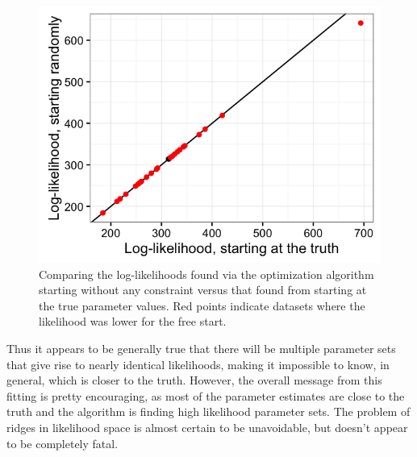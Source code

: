 \documentclass[12pt,reqno,final,pdftex]{amsart}\usepackage[]{graphicx}\usepackage[]{color}
\newenvironment{knitrout}{}{} %
\theoremstyle{plain}
\numberwithin{equation}{part}
\begin{document}
\begin{knitrout}\scriptsize
{}\color{fgcolor}\begin{figure}

\includegraphics[width=\linewidth]{figure/lik-comparison-2-1} \hfill{}

\caption[Comparing the log-likelihoods found via the optimization algorithm starting without any constraint versus that found from starting at the true parameter values]{Comparing the log-likelihoods found via the optimization algorithm starting without any constraint versus that found from starting at the true parameter values. Red points indicate datasets where the likelihood was lower for the free start.}\label{fig:lik-comparison-2}
\end{figure}


\end{knitrout}

\clearpage

Thus it appears to be generally true that there will be multiple parameter sets that give rise to nearly identical likelihoods, making it impossible to know, in general, which is closer to the truth.
However, the overall message from this fitting is pretty encouraging, as most of the parameter estimates are close to the truth and the algorithm is finding high likelihood parameter sets.
The problem of ridges in likelihood space is almost certain to be unavoidable, but doesn't appear to be completely fatal.
\end{document}
